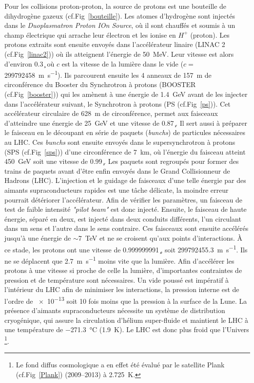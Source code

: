 Pour les collisions proton-proton, la source de protons est une bouteille de dihydrogène gazeux (cf.Fig~\ref{bouteille}). Les atomes d’hydrogène sont injectés dans le \textit{Duoplasmatron Proton IOn Source}, où il sont chauffés et soumis à un champ électrique qui arrache leur électron et les ionise en $H^{+}$ (proton). Les protons extraits sont ensuite envoyés dans l'accélérateur linaire (LINAC 2 (cf.Fig~\ref{linac2})) où ils atteignent l'énergie de \SI{50}{\mega\eV}. Leur vitesse est alors d'environ \SI{0.3}{\c} où $c$ est la vitesse de la lumière dans le vide ($c=$\SI{299 792 458}{\meter\per\second}). Ils parcourent ensuite les \num{4} anneaux de \SI{157}{\meter} de circonférence du Booster du Synchrotron à protons (BOOSTER (cf.Fig~\ref{booster})) qui les amènent à une énergie de \SI{1.4}{\giga\eV} avant de les injecter dans l'accélérateur suivant, le Synchrotron à protons (PS (cf.Fig~\ref{ps})). Cet accélérateur circulaire de \SI{628}{\meter} de circonférence, permet aux faisceaux d'atteindre une énergie de \SI{25}{\giga\eV} et une vitesse de \SI{0.87}{\c}. Il sert aussi à préparer le faisceau en le découpant en série de paquets (\textit{bunchs}) de particules nécessaires au LHC. Ces \textit{bunchs} sont ensuite envoyés dans le supersynchrotron à protons (SPS (cf.Fig~\ref{sps})) d'une circonférence de \SI{7}{\kilo\meter}, où l'énergie du faisceau atteint \SI{450}{\giga\eV} soit une vitesse de \SI{0.99}{\c}. Les paquets sont regroupés pour former des trains de paquets avant d'être enfin envoyés dans le Grand Collisionneur de Hadrons (LHC). L'injection et le guidage de faisceaux d'une telle énergie par des aimants supraconducteurs rapides est une tâche délicate, la moindre erreur pourrait détériorer l'accélérateur. Afin de vérifier les paramètres, un faisceau de test de faible intensité \textit{"pilot beam"} est donc injecté. Ensuite, le faisceau de haute énergie, séparé en deux, est injecté dans deux conduits différents, l'un circulant dans un sens et l'autre dans le sens contraire. Ces faisceaux sont ensuite accélérés jusqu'à une énergie de $\sim$\SI{7}{\tera\eV} et ne se croisent qu'aux points d'interactions. À ce stade, les protons ont une vitesse de \SI{0.999999991}{\c}, soit \SI{299 792 455,3}{\meter\per\second}. Ils ne se déplacent que \SI{2.7}{\meter\per\second} moins vite que la lumière. Afin d'accélérer les protons à une vitesse si proche de celle la lumière, d'importantes contraintes de pression et de température sont nécessaires. Un vide poussé est impératif à l'intérieur du LHC afin de minimiser les interactions, la pression interne est de l'ordre de \SI{e-13}{\atm} soit \num{10} fois moins que la pression à la surface de la Lune. La présence d'aimants supraconducteurs nécessite un système de distribution cryogénique, qui assure la circulation d'hélium super-fluide et maintient le LHC à une température de \SI{-271,3}{\celsius} (\SI{1.9}{\kelvin}). Le LHC est donc plus froid que l'Univers \footnote{Le fond diffus cosmologique a en effet été évalué par le satellite Plank (cf.Fig~\ref{Plank}) (\num{2009}--\num{2013}) à \SI{2,725}{\kelvin}.}.

